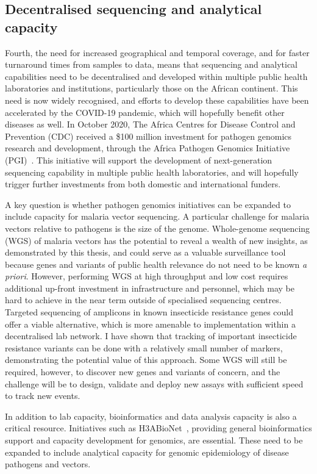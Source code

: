 \documentclass[a4paper,11pt,abstracton,hidelinks]{scrartcl}
\begin{document}
\subsection{Decentralised sequencing and analytical capacity}


Fourth, the need for increased geographical and temporal coverage, and for faster turnaround times from samples to data, means that sequencing and analytical capabilities need to be decentralised and developed within multiple public health laboratories and institutions, particularly those on the African continent.
%
This need is now widely recognised, and efforts to develop these capabilities have been accelerated by the COVID-19 pandemic, which will hopefully benefit other diseases as well.
%
In October 2020, The Africa Centres for Disease Control and Prevention (CDC) received a \$100 million investment for pathogen genomics research and development, through the Africa Pathogen Genomics Initiative (PGI)~\parencite{Makoni2020}.
%
This initiative will support the development of next-generation sequencing capability in multiple public health laboratories, and will hopefully trigger further investments from both domestic and international funders.


A key question is whether pathogen genomics initiatives can be expanded to include capacity for malaria vector sequencing.
%
A particular challenge for malaria vectors relative to pathogens is the size of the genome.
%
Whole-genome sequencing (WGS) of malaria vectors has the potential to reveal a wealth of new insights, as demonstrated by this thesis, and could serve as a valuable surveillance tool because genes and variants of public health relevance do not need to be known \textit{a priori}.
%
However, performing WGS at high throughput and low cost requires additional up-front investment in infrastructure and personnel, which may be hard to achieve in the near term outside of specialised sequencing centres.
%
Targeted sequencing of amplicons in known insecticide resistance genes could offer a viable alternative, which is more amenable to implementation within a decentralised lab network.
%
I have shown that tracking of important insecticide resistance variants can be done with a relatively small number of markers, demonstrating the potential value of this approach.
%
Some WGS will still be required, however, to discover new genes and variants of concern, and the challenge will be to design, validate and deploy new assays with sufficient speed to track new events.


In addition to lab capacity, bioinformatics and data analysis capacity is also a critical resource.
%
Initiatives such as H3ABioNet~\parencite{Kumuthini2019}, providing general bioinformatics support and capacity development for genomics, are essential.
%
These need to be expanded to include analytical capacity for genomic epidemiology of disease pathogens and vectors.
\end{document}
